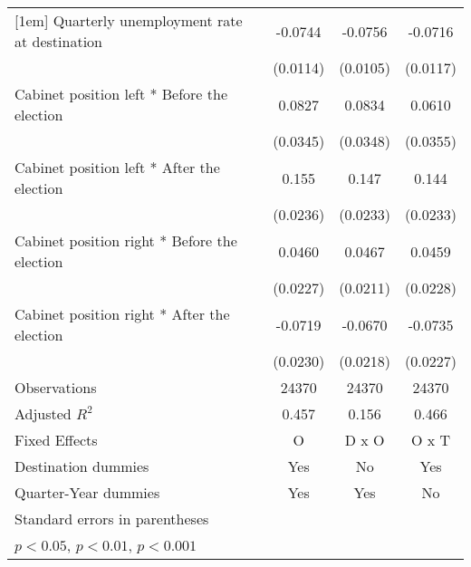 \begin{table}[htbp]
\begin{tabular}{l*{3}{c}}
[1em]
Quarterly unemployment rate at destination&     -0.0744\sym{***}&     -0.0756\sym{***}&     -0.0716\sym{***}\\
                    &    (0.0114)         &    (0.0105)         &    (0.0117)         \\
[1em]
Cabinet position left * Before the election&      0.0827\sym{*}  &      0.0834\sym{*}  &      0.0610         \\
                    &    (0.0345)         &    (0.0348)         &    (0.0355)         \\
[1em]
Cabinet position left * After the election&       0.155\sym{***}&       0.147\sym{***}&       0.144\sym{***}\\
                    &    (0.0236)         &    (0.0233)         &    (0.0233)         \\
[1em]
Cabinet position right * Before the election&      0.0460\sym{*}  &      0.0467\sym{*}  &      0.0459\sym{*}  \\
                    &    (0.0227)         &    (0.0211)         &    (0.0228)         \\
[1em]
Cabinet position right * After the election&     -0.0719\sym{**} &     -0.0670\sym{**} &     -0.0735\sym{**} \\
                    &    (0.0230)         &    (0.0218)         &    (0.0227)         \\
\hline
Observations        &       24370         &       24370         &       24370         \\
Adjusted \(R^{2}\)  &       0.457         &       0.156         &       0.466         \\
Fixed Effects       &           O         &       D x O         &       O x T         \\
Destination dummies &         Yes         &          No         &         Yes         \\
Quarter-Year dummies&         Yes         &         Yes         &          No         \\
\hline\hline
\multicolumn{4}{l}{\footnotesize Standard errors in parentheses}\\
\multicolumn{4}{l}{\footnotesize \sym{*} \(p<0.05\), \sym{**} \(p<0.01\), \sym{***} \(p<0.001\)}\\
\end{tabular}
\end{table}
